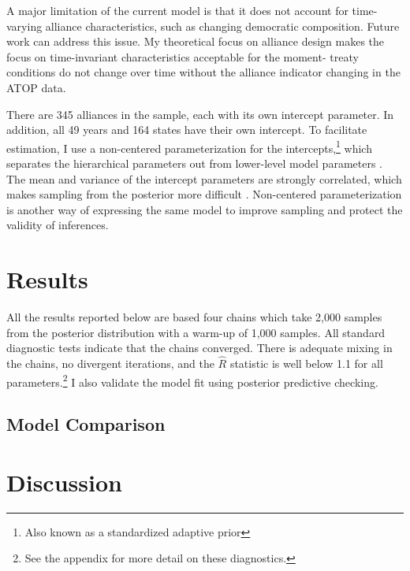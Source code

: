 \documentclass[12pt]{article}
\begin{document}
A major limitation of the current model is that it does not account for time-varying alliance characteristics, such as changing democratic composition. Future work can address this issue. My theoretical focus on alliance design makes the focus on time-invariant characteristics acceptable for the moment- treaty conditions do not change over time without the alliance indicator changing in the ATOP data. 

There are 345 alliances in the sample, each with its own intercept parameter. In addition, all 49 years and 164 states have their own intercept. To facilitate estimation, I use a non-centered parameterization for the intercepts,\footnote{Also known as a standardized adaptive prior} which separates the hierarchical parameters out from lower-level model parameters \citep{McElreath2016}. The mean and variance of the intercept parameters are strongly correlated, which makes sampling from the posterior more difficult \citep{BetancourtGirolani2015}. Non-centered parameterization is another way of expressing the same model to improve sampling and protect the validity of inferences. 


\section*{Results} 

All the results reported below are based four chains which take 2,000 samples from the posterior distribution with a warm-up of 1,000 samples. All standard diagnostic tests indicate that the chains converged. There is adequate mixing in the chains, no divergent iterations, and the $\hat{R}$ statistic is well below 1.1 for all parameters.\footnote{See the appendix for more detail on these diagnostics.} I also validate the model fit using posterior predictive checking. 




\subsection*{Model Comparison}




\section*{Discussion} 



%  
 
\end{document}
